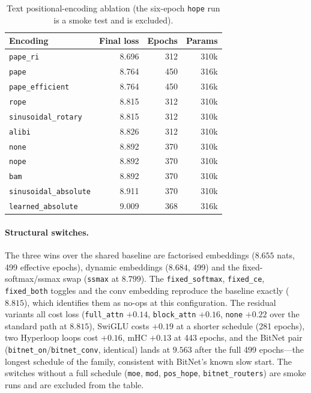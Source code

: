 \begin{table}[H]
\centering
\small
\caption{Text positional-encoding ablation (the six-epoch \texttt{hope} run is a smoke test and is excluded).}
\label{tab:r3-pe}
\begin{tabular}{lrrr}
\toprule
Encoding & Final loss & Epochs & Params \\
\midrule
\texttt{pape\_ri} & 8.696 & 312 & 310k \\
\texttt{pape} & 8.764 & 450 & 316k \\
\texttt{pape\_efficient} & 8.764 & 450 & 316k \\
\texttt{rope} & 8.815 & 312 & 310k \\
\texttt{sinusoidal\_rotary} & 8.815 & 312 & 310k \\
\texttt{alibi} & 8.826 & 312 & 310k \\
\texttt{none} & 8.892 & 370 & 310k \\
\texttt{nope} & 8.892 & 370 & 310k \\
\texttt{bam} & 8.892 & 370 & 310k \\
\texttt{sinusoidal\_absolute} & 8.911 & 370 & 310k \\
\texttt{learned\_absolute} & 9.009 & 368 & 316k \\
\bottomrule
\end{tabular}
\end{table}

\paragraph{Structural switches.}
The three wins over the shared baseline are factorised embeddings ($8.655$ nats, 499 effective epochs), dynamic embeddings ($8.684$, 499) and the fixed-softmax/ssmax swap (\texttt{ssmax} at $8.799$). The \texttt{fixed\_softmax}, \texttt{fixed\_ce}, \texttt{fixed\_both} toggles and the conv embedding reproduce the baseline exactly ($8.815$), which identifies them as no-ops at this configuration. The residual variants all cost loss (\texttt{full\_attn} $+0.14$, \texttt{block\_attn} $+0.16$, \texttt{none} $+0.22$ over the standard path at $8.815$), SwiGLU costs $+0.19$ at a shorter schedule (281 epochs), two Hyperloop loops cost $+0.16$, mHC $+0.13$ at 443 epochs, and the BitNet pair (\texttt{bitnet\_on}/\texttt{bitnet\_conv}, identical) lands at $9.563$ after the full 499 epochs---the longest schedule of the family, consistent with BitNet's known slow start. The switches without a full schedule (\texttt{moe}, \texttt{mod}, \texttt{pos\_hope}, \texttt{bitnet\_routers}) are smoke runs and are excluded from the table.

